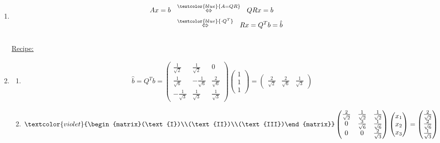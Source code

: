 { \color{solution}
\begin{enumerate}
	\item \begin{align*} 
	Ax=b\ \  &\overset{\textcolor{blue}{A=QR}}{\Leftrightarrow}\ \ QRx=b\\
	&\overset{\textcolor{blue}{\cdot Q^T}}{\Leftrightarrow}\ \ Rx = Q^Tb = \hat{b}
	\end{align*}\\
	\underline{Recipe:}\\ 
	\item 
	\begin{enumerate}
		\item 
		\begin{align*}
		\hat{b} = Q^Tb = \begin{pmatrix}\frac{1}{\sqrt{2}}&\frac{1}{\sqrt{2}}&0\\ \frac{1}{\sqrt{6}}&-\frac{1}{\sqrt{6}}&\frac{2}{\sqrt{6}}\\-\frac{1}{\sqrt{3}}&\frac{1}{\sqrt{3}}&\frac{1}{\sqrt{3}}\end{pmatrix}\begin{pmatrix}1\\1\\1\end{pmatrix}=\begin{pmatrix}\frac{2}{\sqrt{2}}&\frac{2}{\sqrt{6}}&\frac{1}{\sqrt{3}}\end{pmatrix}
		\end{align*}
		\item \begin{align*}
		\textcolor{violet}{\begin{matrix}(\text{I})\\(\text{II})\\(\text{III})\end{matrix}} \begin{pmatrix}\frac{2}{\sqrt{2}}&\frac{1}{\sqrt{2}}&\frac{1}{\sqrt{2}}\\0&\frac{3}{\sqrt{6}}&\frac{1}{\sqrt{6}}\\0&0&\frac{2}{\sqrt{3}}\end{pmatrix}\begin{pmatrix}x_1\\x_2\\x_3\end{pmatrix}=\begin{pmatrix}\frac{2}{\sqrt{2}}\\\frac{2}{\sqrt{6}}\\\frac{1}{\sqrt{3}}\end{pmatrix}

\end{align*}
\end{enumerate}
\end{enumerate}}
